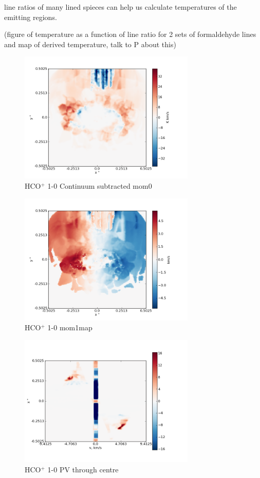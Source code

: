 \documentclass[useAMS,usenatbib]{mn2e}
\begin{document}
line ratios of many lined spieces can help us calculate temperatures of the emitting regions.

(figure of temperature as a function of line ratio for 2 sets of formaldehyde lines and map of derived temperature, talk to P about this)\newline

\begin{figure}
 \includegraphics[width=84mm]{Figures/sim/imageHCOp_1-0_30deg_contSub.png}

 \caption{HCO$^+$ 1-0 Continuum subtracted mom0}
\end{figure}

\begin{figure}
 \includegraphics[width=84mm]{Figures/sim/imageHCOp_1-0_30deg_mom1.png}

 \caption{HCO$^+$ 1-0 mom1map}
\end{figure}

\begin{figure}
 \includegraphics[width=84mm]{Figures/sim/imageHCOp_1-0_30deg_PV_centre.png}

 \caption{HCO$^+$ 1-0 PV through centre}
\end{figure}
\end{document}

